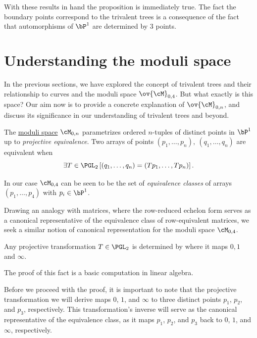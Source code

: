 \documentclass[12pt]{memoir}
\begin{document}
    With these results in hand the proposition is immediately true. The fact the boundary points correspond to the trivalent trees is a consequence of the fact that automorphisms of $\bP^1$ are determined by $3$ points.
    
    \section{Understanding the moduli space}
    
    In the previous sections, we have explored the concept of trivalent trees and their relationship to curves and the moduli space $\ov{\cM}_{0,4}$. But what exactly is this space? Our aim now is to provide a concrete explanation of $\ov{\cM}_{0,n}$, and discuss its significance in our understanding of trivalent trees and beyond.
    
    \begin{Def}
        The \underline{moduli space} $\cM_{0,n}$ parametrizes ordered $n$-tuples of distinct points in $\bP^1$ up to \emph{projective equivalence}. Two arrays of points $(p_1,\dots,p_n),\ (q_1,\dots,q_n)$ are equivalent when 
        $$\exists T\in\PGL_2\left[(q_1,\dots,q_n)=(Tp_1,\dots,Tp_n)\right].$$
    \end{Def}
    
    In our case $\cM_{0,4}$ can be seen to be the set of \emph{equivalence classes} of arrays $(p_1,\dots,p_4)$ with $p_i\in\bP^1$. 
    
    \begin{Rmk}
        Drawing an analogy with matrices, where the row-reduced echelon form serves as a canonical representative of the equivalence class of row-equivalent matrices, we seek a similar notion of canonical representation for the moduli space $\cM_{0,4}$.
    \end{Rmk}
    
    \begin{Prop}
        Any projective transformation $T\in\PGL_2$ is determined by where it maps $0,1$ and $\infty$. 
    \end{Prop}
    
    The proof of this fact is a basic computation in linear algebra.
    
    \begin{Rmk}
        Before we proceed with the proof, it is important to note that the projective transformation we will derive maps $0$, $1$, and $\infty$ to three distinct points $p_1$, $p_2$, and $p_3$, respectively. This transformation's inverse will serve as the canonical representative of the equivalence class, as it maps $p_1$, $p_2$, and $p_3$ back to $0$, $1$, and $\infty$, respectively.
    \end{Rmk}
    
\end{document}

